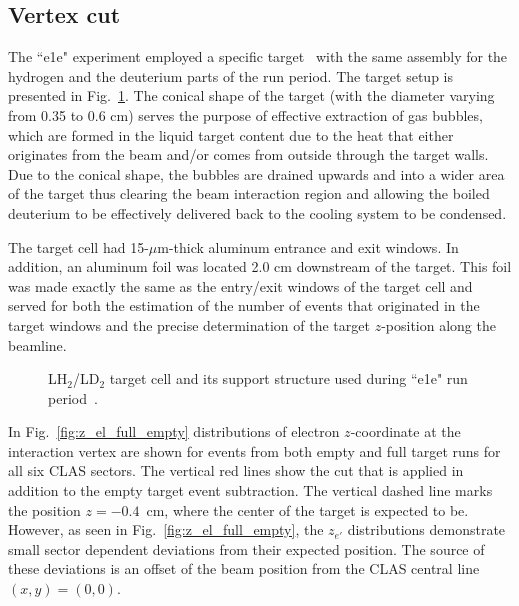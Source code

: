 \subsection{Vertex cut}
\label{Sect:vertex}
\afterpage{\clearpage}

The ``e1e" experiment employed a specific target~\cite{target} with the same assembly for the hydrogen and the deuterium parts of the run period. The target setup is presented in Fig.~\ref{fig:e1e_target}. The conical shape of the target (with the diameter varying from 0.35 to 0.6 cm) serves the purpose of effective extraction of gas bubbles, which are formed in the liquid target content due to the heat that either originates from the beam and/or comes from outside through the target walls. Due to the conical shape, the bubbles are drained upwards and into a wider area of the target thus clearing the beam interaction region and allowing the boiled deuterium to be effectively delivered back to the cooling system to be condensed. 

The target cell had 15-$\mu$m-thick aluminum entrance and exit windows. In addition, an aluminum foil was located 2.0 cm downstream of the target. This foil was made exactly the same as the entry/exit windows of the target cell and served for both the estimation of the number of events that originated in the target windows and the precise determination of the target $z$-position along the beamline.

\begin{figure}[!ht]
\begin{center}
\end{center}
\caption{\small LH$_{2}$/LD$_{2}$ target cell and its support structure used during ``e1e" run period~\cite{target}.  }
\label{fig:e1e_target}
\end{figure}


In Fig.~\ref{fig:z_el_full_empty} distributions of electron $z$-coordinate at the interaction vertex are shown for events from both empty and full target runs for all six CLAS sectors. The vertical red lines show the cut that is applied in addition to the empty target event subtraction. The vertical dashed line marks the position $z = -0.4$~cm, where the center of the target is expected to be. However, as seen in Fig.~\ref{fig:z_el_full_empty}, the $z_{e'}$ distributions demonstrate small sector dependent deviations from their expected position. The source of these deviations is an offset of the beam position from the CLAS central line $(x, y) = (0, 0)$. 

